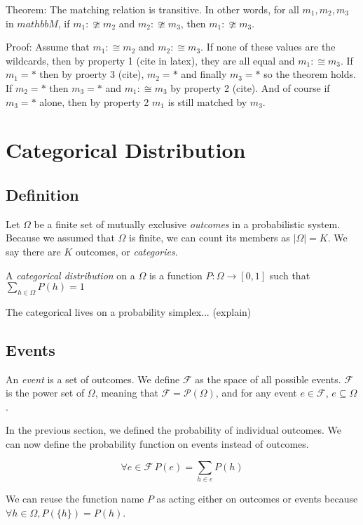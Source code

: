 \documentclass[twoside]{article}
\begin{document}
Theorem: The matching relation is transitive. In other words, for all \(m_1, m_2, m_3\) in \(mathbb{M}\), if \(m_1 :\ncong m_2\) and \(m_2 :\ncong m_3\), then \(m_1 :\ncong m_3\).

Proof: Assume that \(m_1 :\cong m_2\) and \(m_2 :\cong m_3\). If none of these values are the wildcards, then by property 1 (cite in latex), they are all equal and \(m_1 :\cong m_3\). If \(m_1 = \ast\) then by proerty 3 (cite), \(m_2 = \ast\) and finally \(m_3 = \ast\) so the theorem holds. If \(m_2 = \ast\) then \(m_3 = \ast\) and \(m_1 :\cong m_3\) by property 2 (cite). And of course if \(m_3 = \ast\) alone, then by property 2 \(m_1\) is still matched by \(m_3\).

\section{Categorical Distribution}

\subsection{Definition}

Let \(\Omega\) be a finite set of mutually exclusive \textit{outcomes} in a probabilistic system. Because we assumed that \(\Omega\) is finite, we can count its members as \(|\Omega| = K\). We say there are \(K\) outcomes, or \textit{categories}.

A \textit{categorical distribution} on a \(\Omega\) is a function \(P: \Omega \rightarrow [0, 1]\) such that \(\sum_{h \in \Omega} P(h) = 1\)

The categorical lives on a probability simplex... (explain)

\subsection{Events}

An \textit{event} is a set of outcomes. We define \(\mathcal{F}\) as the space of all possible events. \(\mathcal{F}\) is the power set of \(\Omega\), meaning that \(\mathcal{F} = \mathcal{P}(\Omega)\), and for any event \(e \in \mathcal{F}\), \(e \subseteq \Omega\).

In the previous section, we defined the probability of individual outcomes. We can now define the probability function on events instead of outcomes.

\[\forall e \in \mathcal{F}\, P(e) = \sum_{h \in e}{P({h})}\]

We can reuse the function name \(P\) as acting either on outcomes or events because \(\forall h \in \Omega, P(\{h\}) = P(h)\). 
\end{document}
